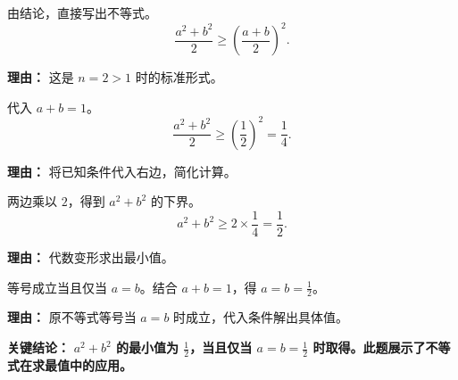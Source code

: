 \begin{examplebox}
\begin{description}[style=nextline, leftmargin=2.8em, labelsep=0.5em, itemsep=0.45em]
    \item[\textbf{第二步（应用不等式）：}] 由结论，直接写出不等式。
    \[
    \frac{a^2+b^2}{2} \ge \left(\frac{a+b}{2}\right)^2.
    \]
    \par\textbf{理由：} 这是 $n=2>1$ 时的标准形式。

    \item[\textbf{第三步（代入条件）：}] 代入 $a+b=1$。
    \[
    \frac{a^2+b^2}{2} \ge \left(\frac{1}{2}\right)^2 = \frac{1}{4}.
    \]
    \par\textbf{理由：} 将已知条件代入右边，简化计算。

    \item[\textbf{第四步（解出目标）：}] 两边乘以 $2$，得到 $a^2+b^2$ 的下界。
    \[
    a^2+b^2 \ge 2 \times \frac{1}{4} = \frac{1}{2}.
    \]
    \par\textbf{理由：} 代数变形求出最小值。

    \item[\textbf{第五步（取等条件）：}] 等号成立当且仅当 $a=b$。结合 $a+b=1$，得 $a=b=\frac{1}{2}$。
    \par\textbf{理由：} 原不等式等号当 $a=b$ 时成立，代入条件解出具体值。
\end{description}

\textbf{\textcolor{CExample}{关键结论：}} \textbf{$a^2+b^2$ 的最小值为 $\frac{1}{2}$，当且仅当 $a=b=\frac{1}{2}$ 时取得。此题展示了不等式在求最值中的应用。}

\end{examplebox}
